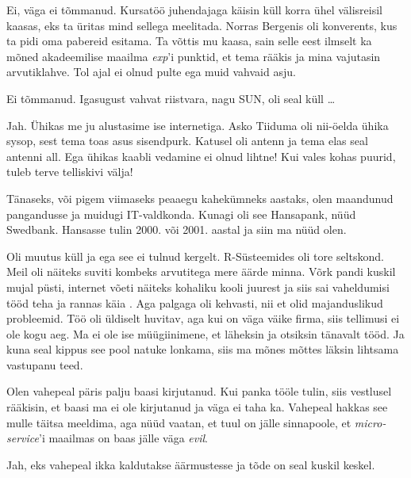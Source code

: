 
Ei, väga ei tõmmanud. Kursatöö juhendajaga käisin küll korra ühel 
välisreisil kaasas, eks ta üritas mind sellega meelitada. Norras 
Bergenis oli konverents, kus ta pidi oma pabereid esitama. Ta võttis mu kaasa, sain selle 
eest ilmselt ka mõned akadeemilise maailma \emph{exp}'i punktid, et tema rääkis ja mina vajutasin 
arvutiklahve. Tol ajal ei olnud pulte ega muid vahvaid asju. 


Ei tõmmanud. Igasugust vahvat riistvara, 
nagu SUN, oli seal küll \ldots 


Jah. Ühikas me ju alustasime ise internetiga. Asko 
Tiiduma oli nii-öelda ühika sysop, sest tema 
toas asus sisendpurk. Katusel oli antenn ja tema elas seal antenni 
all. Ega ühikas kaabli vedamine ei olnud lihtne! Kui vales kohas puurid, tuleb terve telliskivi välja!


Tänaseks, või pigem viimaseks peaaegu kahekümneks aastaks, olen maandunud 
pangandusse ja muidugi IT-valdkonda. Kunagi oli see Hansapank, 
nüüd Swedbank. Hansasse tulin 2000. või 2001. aastal ja siin ma nüüd olen.


Oli muutus küll ja ega see ei tulnud kergelt. R-Süsteemides oli tore 
seltskond. Meil oli näiteks suviti kombeks arvutitega 
mere äärde minna. Võrk pandi kuskil mujal püsti, internet võeti näiteks kohaliku kooli juurest ja siis sai vaheldumisi tööd teha ja rannas käia . Aga palgaga oli kehvasti, nii et olid majanduslikud probleemid. Töö oli üldiselt 
huvitav, aga kui on väga väike firma, siis tellimusi ei ole kogu aeg. Ma ei 
ole ise müügiinimene, et läheksin ja otsiksin tänavalt tööd. Ja kuna seal 
kippus see pool natuke lonkama, siis ma mõnes mõttes läksin 
lihtsama vastupanu teed. 

Olen vahepeal päris palju baasi 
kirjutanud. Kui panka tööle tulin, siis vestlusel rääkisin, 
et baasi ma ei ole kirjutanud ja väga ei taha ka. Vahepeal hakkas 
see mulle täitsa meeldima, aga nüüd vaatan, et tuul on jälle sinnapoole, et \emph{micro-service}'i maailmas on baas jälle väga \emph{evil}. 


Jah, eks vahepeal ikka kaldutakse äärmustesse ja tõde on seal kuskil 
keskel.